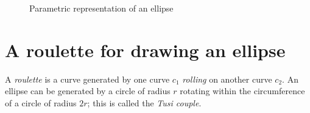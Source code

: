 \begin{figure}[b]
\begin{center}
\caption{Parametric representation of an ellipse}\label{f.parametric1}
\end{center}
\end{figure}


\section{A roulette for drawing an ellipse}\label{s.roulette}

A \emph{roulette} is a curve generated by one curve $c_1$ \emph{rolling} on another curve $c_2$. An ellipse can be generated by a circle of radius $r$ rotating within the circumference of a circle of radius $2r$; this is called the \emph{Tusi couple}.


